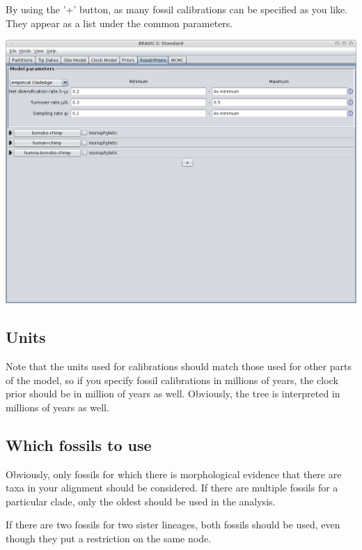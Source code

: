 \documentclass{article}
\begin{document}
By using the '+' button, as many fossil calibrations can be specified as you like.
They appear as a list under the common parameters.
\begin{center}\includegraphics[width=\textwidth,clip=true,trim=0 300 0 0]{fossilPriorsTab3.png}\end{center}

\subsection{Units}
Note that the units used for calibrations should match those used for other
parts of the model, so if you specify fossil calibrations in millions of years, the
clock prior should be in million of years as well. Obviously, the tree is interpreted
in millions of years as well.

\subsection{Which fossils to use}
Obviously, only fossils for which there is morphological evidence that there are
taxa in your alignment should be considered.
If there are multiple fossils for a particular clade, only the oldest should be
used in the analysis.

If there are two fossils for two sister lineages, both fossils should be used, even
though they put a restriction on the same node.
\end{document}

